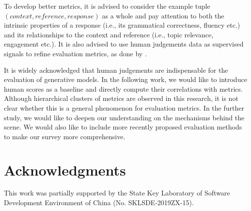 \documentclass[conference]{IEEEtran}
\begin{document}
To develop better metrics, it is advised to consider the example tuple $(context, reference, response)$
as a whole and pay attention to both the intrinsic properties of a response (i.e., its grammatical correctness, fluency etc.) and its relationships to the context and reference (i.e., topic relevance, engagement etc.). It is also advised to use human judgements data as supervised signals to refine evaluation metrics, as done by \cite{ADEM}.

It is widely acknowledged that human judgements are indispensable for the evaluation of generative models.
In the following work, we would like to introduce human scores as a baseline and directly compute their correlations with metrics.
Although hierarchical clusters of metrics are observed in this research, it is not clear whether this is a general phenomenon for evaluation metrics. In the further study, we would like to deepen our understanding on the mechanisms behind the scene.
We would also like to include more recently proposed evaluation methods to make our survey more comprehensive.

\section*{Acknowledgments}
This work was partially supported by the State Key Laboratory of Software Development Environment of China (No. SKLSDE-2019ZX-15).



%
%
%
\balance




\end{document}
